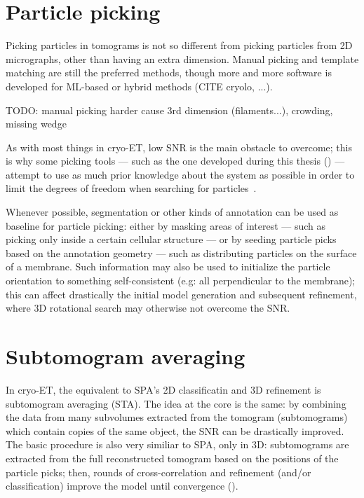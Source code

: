 \section{Particle picking}\label{et_particle_picking}
Picking particles in tomograms is not so different from picking particles from 2D micrographs, other than having an extra dimension.
Manual picking and template matching are still the preferred methods, though more and more software is developed for ML-based or hybrid methods (CITE cryolo, ...).

TODO: manual picking harder cause 3rd dimension (filaments...), crowding, missing wedge

As with most things in cryo-ET, low SNR is the main obstacle to overcome; this is why some picking tools --- such as the one developed during this thesis () --- attempt to use as much prior knowledge about the system as possible in order to limit the degrees of freedom when searching for particles~\cite{castano-diezDynamoCatalogueGeometrical2017,wagnerEvolutionSPHIREcrYOLOParticle2020,gaifasBlikExtensible3D2024}.

Whenever possible, segmentation or other kinds of annotation can be used as baseline for particle picking: either by masking areas of interest --- such as picking only inside a certain cellular structure --- or by seeding particle picks based on the annotation geometry --- such as distributing particles on the surface of a membrane.
Such information may also be used to initialize the particle orientation to something self-consistent (e.g: all perpendicular to the membrane); this can affect drastically the initial model generation and subsequent refinement, where 3D rotational search may otherwise not overcome the SNR.

\section{Subtomogram averaging}\label{et_sta}
In cryo-ET, the equivalent to SPA's 2D classificatin and 3D refinement is subtomogram averaging (STA).
The idea at the core is the same: by combining the data from many subvolumes extracted from the tomogram (subtomograms) which contain copies of the same object, the SNR can be drastically improved.
The basic procedure is also very similiar to SPA, only in 3D: subtomograms are extracted from the full reconstructed tomogram based on the positions of the particle picks; then, rounds of cross-correlation and refinement (and/or classification) improve the model until convergence ().

